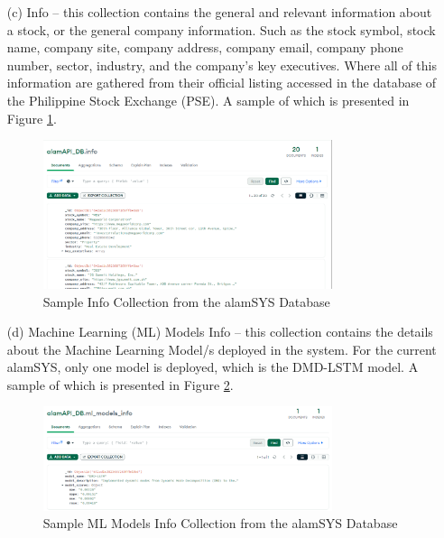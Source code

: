 \begin{itemize}
    \item[(c)] Info – this collection contains the general and relevant 
    information about a stock, or the general company information. Such as
    the stock symbol, stock name, company site, company address, company email,
    company phone number, sector, industry, and the company's key executives. Where
    all of this information are gathered from their official listing accessed in the
    database of the Philippine Stock Exchange (PSE). A sample of which is presented
    in Figure \ref{fig:odm_info_sample}.
    \begin{figure}[ht]
        \centering
        \includegraphics[width=0.80\textwidth]{./assets/Chapter_3/ODM/ODM_Info_Sample.png}
        \caption{Sample Info Collection from the alamSYS Database}
        \label{fig:odm_info_sample}
    \end{figure}
    \FloatBarrier

    \item[(d)] Machine Learning (ML) Models Info – this collection contains
    the details about the Machine Learning Model/s deployed in the system. For the current
    alamSYS, only one model is deployed, which is the DMD-LSTM model. A sample of which
    is presented in Figure \ref{fig:odm_ml_sample}.
    \begin{figure}[ht]
        \centering
        \includegraphics[width=0.80\textwidth]{./assets/Chapter_3/ODM/ODM_ML_Sample.png}
        \caption{Sample ML Models Info Collection from the alamSYS Database}
        \label{fig:odm_ml_sample}
    \end{figure}
    \FloatBarrier


\end{itemize}
